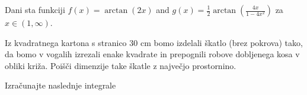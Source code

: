 \documentclass[11pt,a4paper]{exam}
\renewcommand{\{}{\lbrace}
\renewcommand{\}}{\rbrace}
\begin{document}
\begin{questions}
	\question Dani sta funkciji $f(x)=\arctan (2x)$ and $g(x)=\frac{1}{2} \arctan \left( \frac{4x}{1-4x^{2}} \right)$ za $x \in (1,\infty)$. 
		
		\vspace{1cm}
	\question[17] Iz kvadratnega kartona s stranico $30$ cm bomo izdelali škatlo (brez pokrova) tako, da bomo v vogalih izrezali enake kvadrate in prepognili robove dobljenega kosa v obliki križa. Poišči dimenzije take škatle z največjo prostornino.
	
	\vspace{1cm}
	\question Izračunajte naslednje integrale
\end{questions}
\end{document}

